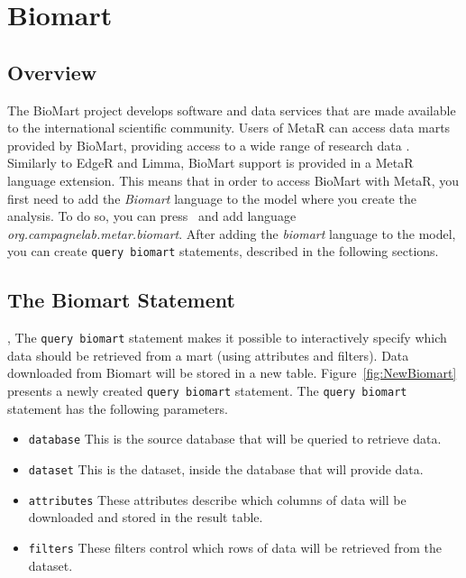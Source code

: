 

\chapter{Biomart}\label{chap:Biomart}

\section{Overview}
The BioMart project develops software and data services that are made available to the international scientific community. Users of MetaR can access data marts provided by BioMart, providing access to a wide range of research data . Similarly to EdgeR and Limma, BioMart support is provided in a MetaR language extension. This means that in order to access BioMart with MetaR, you first need to add the \textit{Biomart} language to the model where you create the analysis. To do so, you can press~ and add language \textit{org\allowbreak.campagnelab\allowbreak.metar\allowbreak.biomart}. After adding the \textit{biomart} language to the model, you can create \texttt{query biomart} statements, described in the following sections. 

\section{The Biomart Statement},
The \texttt{query biomart} statement makes it possible to interactively specify which data should be retrieved from a mart (using attributes and filters). Data downloaded from Biomart will be stored in a new table. Figure~\ref{fig:NewBiomart} presents a newly created \texttt{query biomart} statement.
The \texttt{query biomart} statement has the following parameters.
\begin{itemize}
\item \texttt{database} This is the source database that will be queried to retrieve data.
\item \texttt{dataset} This is the dataset, inside the database that will provide data.
\item \texttt{attributes} These attributes describe which columns of data will be downloaded and stored in the result table.
\item \texttt{filters} These filters control which rows of data will be retrieved from the dataset.
\end{itemize} 

